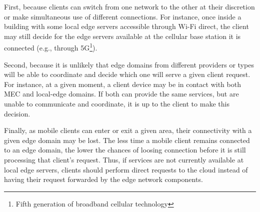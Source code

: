 First, because clients can switch from one network to the other at their discretion or make simultaneous use of different connections. For instance, once inside a building with some local edge servers accessible through Wi-Fi direct, the client may still decide for the edge servers available at the cellular base station it is connected (e.g., through 5G\footnote{Fifth generation of broadband cellular technology}). 

Second, because it is unlikely that edge domains from different providers or types will be able to coordinate and decide which one will serve a given client request. For instance, at a given moment, a client device may be in contact with both MEC and local-edge domains. If both can provide the same services, but are unable to communicate and coordinate, it is up to the client to make this decision.





Finally, as mobile clients can enter or exit a given area, their connectivity with a given edge domain may be lost. The less time a mobile client remains connected to an edge domain, the lower the chances of loosing connection before it is still processing that client's request. Thus, if services are not currently available at local edge servers, clients should perform direct requests to the cloud instead of having their request forwarded by the edge network components. 


